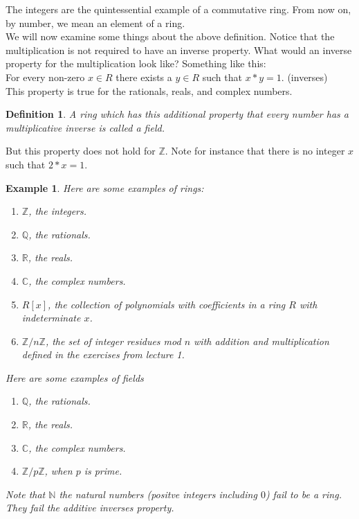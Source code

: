 \documentclass{article}
\theoremstyle{problemstyle}
\newtheorem{example}{Example}
\newtheorem{definition}{Definition}
\begin{document}
The integers are the quintessential example of a commutative ring. From now on, by number, we mean an element of a ring.\\

We will now examine some things about the above definition. Notice that the multiplication is not required to have an inverse property. What would an inverse property for the multiplication look like? Something like this:\\

For every non-zero $x \in R$ there exists a $y \in R$ such that $x*y  = 1$. (inverses)\\

This property is true for the rationals, reals, and complex numbers. 

\begin{definition}
A ring which has this additional property that every number has a multiplicative inverse is called a field.
\end{definition}

But this property does not hold for $\mathbb{Z}$. Note for instance that there is no integer $x$ such that $2*x = 1$.\\

\begin{example}
Here are some examples of rings: 
\begin{enumerate}
\item $\mathbb{Z}$, the integers. 
\item $\mathbb{Q}$, the rationals. 
\item $\mathbb{R}$, the reals. 
\item $\mathbb{C}$, the complex numbers. 
\item $R[x]$, the collection of polynomials with coefficients in a ring $R$ with indeterminate $x$.
\item $\mathbb{Z}/n\mathbb{Z}$, the set of integer residues mod $n$ with addition and multiplication defined in the exercises from lecture 1. 
\end{enumerate}

Here are some examples of fields

\begin{enumerate}
\item $\mathbb{Q}$, the rationals. 
\item $\mathbb{R}$, the reals. 
\item $\mathbb{C}$, the complex numbers. 
\item $\mathbb{Z}/p\mathbb{Z}$, when $p$ is prime. 
\end{enumerate}

Note that $\mathbb{N}$ the natural numbers (positve integers including $0$) fail to be a ring. They fail the additive inverses property.\\

\end{example}
\end{document}
